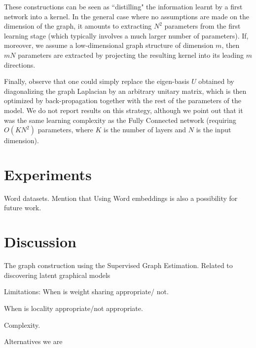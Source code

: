 \documentclass{article} %
\begin{document}
These constructions can be seen as ``distilling" the information learnt by a first network into a kernel. In the general case where no assumptions are made on the dimension of the graph, it amounts to extracting $N^2$ parameters from the first learning stage (which typically involves a much larger number of parameters). If, moreover, we assume a low-dimensional graph structure of dimension $m$, then $m N$ parameters are extracted by projecting the resulting kernel into its leading $m$ directions.

Finally, observe that one could simply replace the eigen-basis $U$ obtained by diagonalizing the graph Laplacian by an arbitrary unitary matrix, which is then optimized by back-propagation together with the rest of the parameters of the model. We do not report results on this strategy, although we point out that it was the same learning complexity as the Fully Connected network (requiring $O(K N^2)$ parameters, where $K$ is the number of layers and $N$ is the input dimension).


\section{ Experiments }


Word datasets. Mention that Using Word embeddings is also a possibility for future work.

\section{Discussion}

The graph construction using the Supervised Graph Estimation. 
Related to discovering latent graphical models

Limitations: 
When is weight sharing appropriate/ not. 

When is locality appropriate/not appropriate. 

Complexity.

 Alternatives we are


{}

\end{document}
